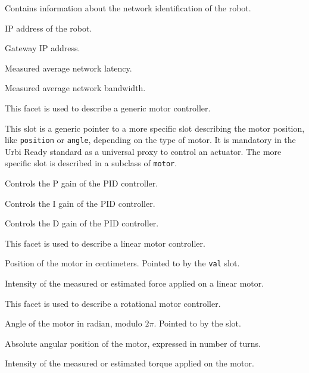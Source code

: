 
Contains information about the network identification of the robot.

\begin{slots}
  {%
    IP address of the robot.%
  }

  {%
    Gateway IP address.%
  }

  {%
    Measured average network latency.%
  }

  {%
    Measured average network bandwidth.%
  }

\end{slots}


This facet is used to describe a generic motor controller.

\begin{slots}
  {%
    This slot is a generic pointer to a more specific slot describing
    the motor position, like \texttt{position} or \texttt{angle},
    depending on the type of motor. It is mandatory in the Urbi Ready
    standard as a universal proxy to control an actuator. The more
    specific slot is described in a subclass of \texttt{motor}.%
  }

  {%
    Controls the P gain of the PID controller.%
  }

  {%
    Controls the I gain of the PID controller.%
  }

  {%
    Controls the D gain of the PID controller.%
  }

\end{slots}



This facet is used to describe a linear motor controller.

\begin{slots}
  {%
    Position of the motor in centimeters.  Pointed to by the
    \texttt{val} slot.%
  }

  {%
    Intensity of the measured or estimated force applied on a linear
    motor.%
  }

\end{slots}



This facet is used to describe a rotational motor controller.

\begin{slots}
  {%
    Angle of the motor in radian, modulo $2\pi$. Pointed to by the
     slot.%
  }

  {%
    Absolute angular position of the motor, expressed in number of
    turns.%
  }

  {%
    Intensity of the measured or estimated torque applied on the
    motor.%
  }

\end{slots}


